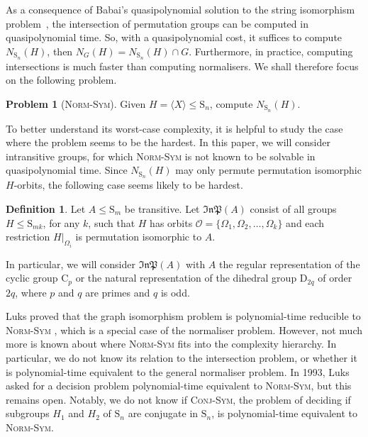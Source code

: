 \documentclass[11pt,a4paper]{article}
\theoremstyle{definition}
\newtheorem{definition}[theorem]{Definition}
\newtheorem{problem}[theorem]{Problem}
\theoremstyle{remark}
\newcommand{\InP}{\mathfrak{InP}}
\newcommand{\Sy}{\mathrm{S}}
\newcommand{\Cy}{\mathrm{C}}
\newcommand{\Di}{\mathrm{D}}
\begin{document}
As a consequence of Babai's quasipolynomial solution to the string isomorphism problem~\cite{babaiGI}, the intersection of permutation groups can be computed in quasipolynomial time. 
So, with a quasipolynomial cost, it suffices to compute $N_{\Sy_n}(H)$, then $N_{G}(H) = N_{\Sy_n}(H) \cap G$. 
Furthermore, in practice, computing intersections is much faster than computing normalisers.  
We shall therefore focus on the following problem.
\begin{problem}[\textsc{Norm-Sym}]
Given $H = \langle X \rangle \leq \Sy_n$, compute $N_{\Sy_n}(H)$.
\end{problem}


To better understand its worst-case complexity, it is helpful to study the case where the problem seems to be the hardest. 
In this paper, we will consider intransitive groups, for which \textsc{Norm-Sym} is not known to be solvable in quasipolynomial time. 
Since $N_{\Sy_n}(H)$ may only permute permutation isomorphic $H$-orbits, the following case seems likely to be hardest. 

\begin{definition}\label{our H}
Let $A \leq \Sy_m$ be transitive. 
Let $\mathfrak{InP}(A)$ consist of all groups $H \leq \Sy_{mk}$, for any $k$, such that $H$ has orbits $\mathcal{O} = \{ \Omega_1, \Omega_2, \ldots, \Omega_k \}$ and each restriction $H|_{\Omega_i}$ is permutation isomorphic to $A$.
\end{definition} 

In particular, we will consider $\InP(A)$ with $A$ the regular representation of the cyclic group $\Cy_p$ or the natural representation of the dihedral group $\Di_{2q}$ of order $2q$, where $p$ and $q$ are primes and $q$ is odd.

Luks proved that the graph isomorphism problem is polynomial-time reducible to \textsc{Norm-Sym} \cite{luksHierarchy}, which is a special case of the normaliser problem. 
However, not much more is known about where \textsc{Norm-Sym} fits into the complexity hierarchy. In particular, we do not know its relation to the intersection problem, or whether it is polynomial-time equivalent to the general normaliser problem. 
In 1993, Luks asked \cite{luksHierarchy} for a decision problem polynomial-time equivalent to \textsc{Norm-Sym}, but this remains open. 
Notably, we do not know if \textsc{Conj-Sym}, the problem of deciding if subgroups $H_1$ and $H_2$ of $\Sy_n$ are conjugate in $\Sy_n$, is polynomial-time equivalent to \textsc{Norm-Sym}. 
\end{document}
